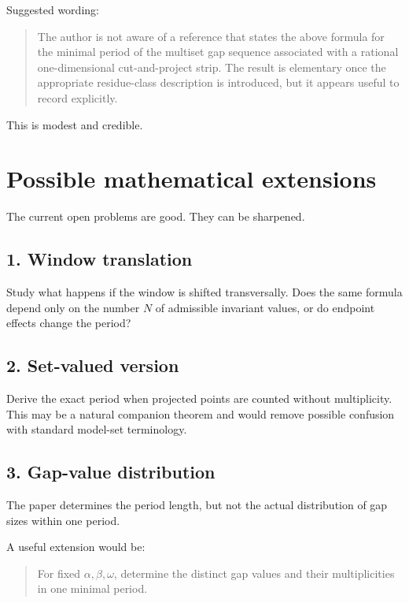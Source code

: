 \documentclass[11pt]{article}
\begin{document}
Suggested wording:

\begin{quote}
The author is not aware of a reference that states the above formula for the
minimal period of the multiset gap sequence associated with a rational
one-dimensional cut-and-project strip.  The result is elementary once the
appropriate residue-class description is introduced, but it appears useful to
record explicitly.
\end{quote}

This is modest and credible.

\section*{Possible mathematical extensions}

The current open problems are good.  They can be sharpened.

\subsection*{1. Window translation}

Study what happens if the window is shifted transversally.  Does the same
formula depend only on the number \(N\) of admissible invariant values, or do
endpoint effects change the period?

\subsection*{2. Set-valued version}

Derive the exact period when projected points are counted without
multiplicity.  This may be a natural companion theorem and would remove
possible confusion with standard model-set terminology.

\subsection*{3. Gap-value distribution}

The paper determines the period length, but not the actual distribution of
gap sizes within one period.

A useful extension would be:

\begin{quote}
For fixed \(\alpha,\beta,\omega\), determine the distinct gap values and
their multiplicities in one minimal period.
\end{quote}
\end{document}
